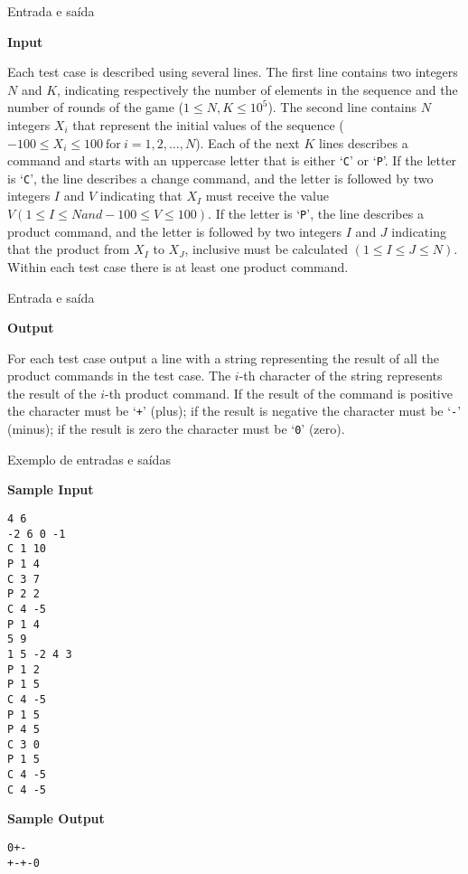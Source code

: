 \begin{frame}[fragile]{Entrada e saída}

\textbf{Input}

Each test case is described using several lines. The first line contains two integers $N$ and 
$K$, indicating respectively the number of elements in the sequence and the number of rounds of 
the game ($1\leq N, K\leq 10^5$). The second line contains $N$ integers $X_i$ that represent the 
initial values of the sequence ($-100\leq X_i\leq 100\ \mbox{for}\ i = 1, 2, \ldots, N$). Each of the next 
$K$ lines describes a command and starts with an uppercase letter that is either `\texttt{C}' or 
`\texttt{P}'. If the letter is `\texttt{C}', the line describes a change command, and
the letter is followed by two integers $I$ and $V$ indicating that $X_I$ must receive the value 
$V (1\leq I\leq N and -100\leq V\leq 100)$. If the letter is `\texttt{P}', the line describes a 
product command, and the letter is followed by two integers $I$ and $J$ indicating that the 
product from $X_I$ to $X_J$, inclusive must be calculated $(1\leq I\leq J\leq N)$. Within each 
test case there is at least one product command.

\end{frame}

\begin{frame}[fragile]{Entrada e saída}

\textbf{Output}

For each test case output a line with a string representing the result of all the product commands 
in the test case. The $i$-th character of the string represents the result of the $i$-th product 
command. If the result of the command is positive the character must be `\texttt{+}' (plus); if 
the result is negative the character must be `\texttt{-}' (minus); if the result is zero the 
character must be `\texttt{0}' (zero).

\end{frame}


\begin{frame}[fragile]{Exemplo de entradas e saídas}

\begin{footnotesize}
\begin{minipage}[t]{0.6\textwidth}
\textbf{Sample Input}
\begin{verbatim}
4 6
-2 6 0 -1
C 1 10
P 1 4
C 3 7
P 2 2
C 4 -5
P 1 4
5 9
1 5 -2 4 3
P 1 2
P 1 5
C 4 -5
P 1 5
P 4 5
C 3 0
P 1 5
C 4 -5
C 4 -5
\end{verbatim}
\end{minipage}
\begin{minipage}[t]{0.35\textwidth}
\textbf{Sample Output}
\begin{verbatim}
0+-
+-+-0
\end{verbatim}
\end{minipage}
\end{footnotesize}

\end{frame}


